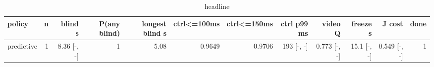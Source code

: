 \begin{table}[t]\centering\small
\begin{tabular}{lrrrrrrrrrrr}\toprule
policy & n & blind s & P(any blind) & longest blind s & ctrl<=100ms & ctrl<=150ms & ctrl p99 ms & video Q & freeze s & J cost & done \\\midrule
predictive & 1 & 8.36 [-, -] & 1 & 5.08 & 0.9649 & 0.9706 & 193 [-, -] & 0.773 [-, -] & 15.1 [-, -] & 0.549 [-, -] & 1 \\
\bottomrule\end{tabular}\caption{headline}\end{table}
